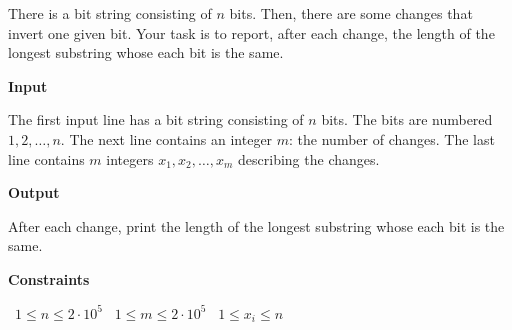 There is a bit string consisting of $n$ bits. Then, there are some changes that invert one given bit. Your task is to report, after each change, the length of the longest substring whose each bit is the same.

\vspace{0.3cm}\noindent\textbf{Input}

The first input line has a bit string consisting of $n$ bits. The bits are numbered $1,2,\ldots,n$.
The next line contains an integer $m$: the number of changes.
The last line contains $m$ integers $x_1,x_2,\ldots,x_m$ describing the changes.

\vspace{0.3cm}\noindent\textbf{Output}

After each change, print the length of the longest substring whose each bit is the same.

\vspace{0.3cm}\noindent\textbf{Constraints}

\textbullet\ $1 \le n \le 2 \cdot 10^5$
\textbullet\ $1 \le m \le 2 \cdot 10^5$
\textbullet\ $1 \le x_i \le n$